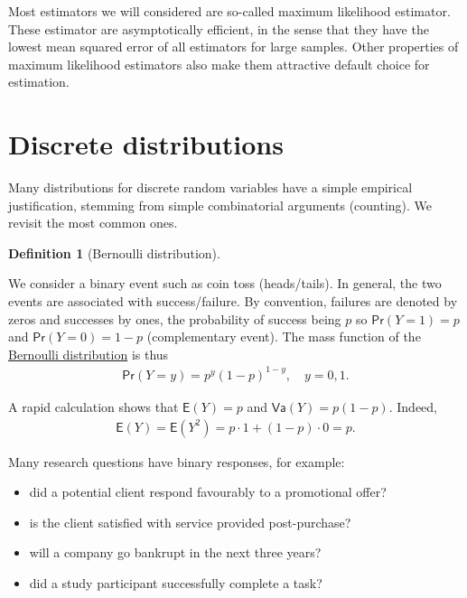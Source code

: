 \documentclass[
  11pt,
  letterpaper,
]{scrbook}
\providecommand{\tightlist}{%
  \setlength{\itemsep}{0pt}\setlength{\parskip}{0pt}}\usepackage{longtable,booktabs,array}
\theoremstyle{definition}
\newtheorem{definition}{Definition}[chapter]
\theoremstyle{definition}
\theoremstyle{plain}
\theoremstyle{plain}
\theoremstyle{remark}
\begin{document}
Most estimators we will considered are so-called maximum likelihood
estimator. These estimator are asymptotically efficient, in the sense
that they have the lowest mean squared error of all estimators for large
samples. Other properties of maximum likelihood estimators also make
them attractive default choice for estimation.

\section{Discrete distributions}\label{discrete-distributions}

Many distributions for discrete random variables have a simple empirical
justification, stemming from simple combinatorial arguments (counting).
We revisit the most common ones.

\begin{definition}[Bernoulli
distribution]\protect\hypertarget{def-bernoullidist}{}\label{def-bernoullidist}

We consider a binary event such as coin toss (heads/tails). In general,
the two events are associated with success/failure. By convention,
failures are denoted by zeros and successes by ones, the probability of
success being \(p\) so \(\mathsf{Pr}(Y=1)=p\) and
\(\mathsf{Pr}(Y=0)=1-p\) (complementary event). The mass function of the
\href{https://en.wikipedia.org/wiki/Bernoulli_distribution}{Bernoulli
distribution} is thus \begin{align*}
\mathsf{Pr}(Y=y) = p^y (1-p)^{1-y}, \quad y=0, 1.
\end{align*}

\end{definition}

A rapid calculation shows that \(\mathsf{E}(Y)=p\) and
\(\mathsf{Va}(Y)=p(1-p).\) Indeed, \begin{align*}
\mathsf{E}(Y) = \mathsf{E}(Y^2) = p \cdot 1 + (1-p) \cdot 0 = p.
\end{align*}

Many research questions have binary responses, for example:

\begin{itemize}
\tightlist
\item
  did a potential client respond favourably to a promotional offer?
\item
  is the client satisfied with service provided post-purchase?
\item
  will a company go bankrupt in the next three years?
\item
  did a study participant successfully complete a task?
\end{itemize}
\end{document}
